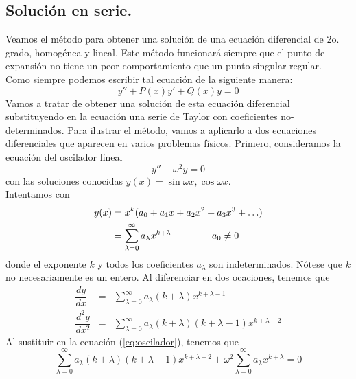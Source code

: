 \subsection{Solución en serie.}
Veamos el método para obtener una solución de una ecuación diferencial de 2o. grado, homogénea y lineal. Este método funcionará siempre que el punto de expansión no tiene un peor comportamiento que un punto singular regular.
\\
Como siempre podemos escribir tal ecuación de la siguiente manera:
\begin{equation}
y'' + P(x) y' + Q(x) y = 0
\end{equation}
Vamos a tratar de obtener una solución de esta ecuación diferencial substituyendo en la ecuación una serie de Taylor con coeficientes no-determinados. Para ilustrar el método, vamos a aplicarlo a dos ecuaciones diferenciales que aparecen en varios problemas físicos. Primero, consideramos la ecuación del oscilador lineal
\begin{equation}
y'' + \omega^{2} y =0 \label{eq:oscilador}
\end{equation}
con las soluciones conocidas $y(x) = \sin \omega x, \cos \omega x$.
\\
Intentamos con
\begin{eqnarray}
\begin{aligned}
y(x) &= x^{k} (a_{0} + a_{1} x + a_{2} x^{2} + a_{3} x^{3} + \ldots ) \\
&= \sum_{\lambda=0}^{\infty} a_{\lambda} x^{k+\lambda} \hspace{1.5cm} a_{0} \neq 0
\end{aligned}
\end{eqnarray}
donde el exponente $k$ y todos los coeficientes $a_{\lambda}$ son indeterminados. Nótese que $k$ no necesariamente es un entero. Al diferenciar en dos ocaciones, tenemos que
\begin{eqnarray*}
\dfrac{d y}{d x} &=& \sum_{\lambda = 0}^{\infty} a_{\lambda} (k + \lambda) x^{k + \lambda -1} \\
\dfrac{d^{2} y}{d x^{2}} &=& \sum_{\lambda = 0}^{\infty} a_{\lambda} (k + \lambda) (k + \lambda -1) x^{k + \lambda -2}
\end{eqnarray*}
Al sustituir en la ecuación (\ref{eq:oscilador}), tenemos que
\begin{equation}
\sum_{\lambda=0}^{\infty} a_{\lambda} (k + \lambda) (k + \lambda - 1) x^{k + \lambda -2} + \omega^{2} \sum_{\lambda=0}^{\infty} a_{\lambda} x^{k+\lambda} = 0 \label{eq:oscilador_desarrollado}
\end{equation}
